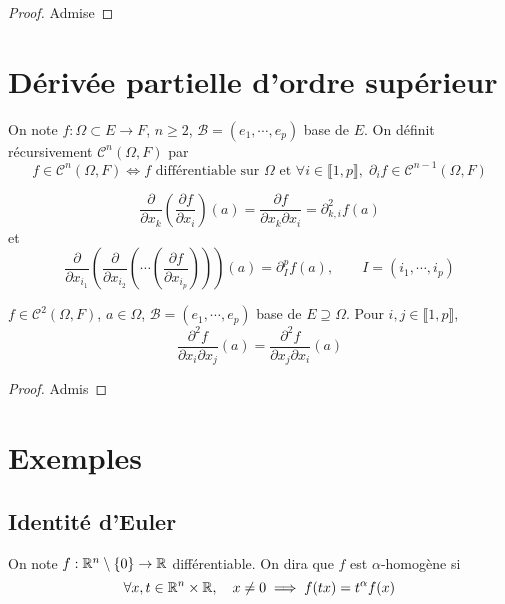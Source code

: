 \begin{proof}
    Admise
\end{proof}

\section{Dérivée partielle d'ordre supérieur}

\begin{dfn}
    On note $f:\Omega\subset E\to F$, $n\geq 2$, $\mathcal B=(e_1, \cdots, e_p)$ base de $E$. On définit récursivement $\mathcal C^n(\Omega, F)$ par \[
        f\in\mathcal C^n(\Omega, F)\iff f \text{ différentiable sur }\Omega\text{ et }\forall i\in\llbracket 1, p\rrbracket, \; \partial_i f\in\mathcal C^{n-1}(\Omega, F)
    \]
\end{dfn}

\begin{notation}
    \[
        \frac{\partial}{\partial x_k} \left( \frac{\partial f}{\partial x_i}  \right) (a)= \frac{\partial f}{\partial x_k\partial x_i}=\partial^2_{k,i}f(a) 
    \]
    et \[
        \frac{\partial}{\partial x_{i_1}} \left( \frac{\partial }{\partial x_{i_2}} \left( \cdots \left( \frac{\partial f}{\partial x_{i_p}}  \right)\right)  \right)(a)=\partial^p_I f(a), \qquad I=(i_1, \cdots, i_p)
    \]
\end{notation}

\begin{thm}[Schwarz]
    \Hyp $f\in \mathcal C^2(\Omega, F)$, $a\in \Omega$, $\mathcal B=(e_1, \cdots, e_p)$ base de $E\supseteq \Omega$.
    \Conc Pour $i, j\in\llbracket 1, p\rrbracket$,  \[
        \frac{\partial^2f}{\partial x_i\partial x_j} (a)= \frac{\partial^2f}{\partial x_j\partial x_i} (a)
    \]
\end{thm}

\begin{proof}
    Admis
\end{proof}

\section{Exemples}

\subsection{Identité d'Euler}

On note $f:\mathbb R^n\setminus \{0\}\to \mathbb R$ différentiable. On dira que $f$ est $\alpha$-homogène si \[\forall x, t\in\mathbb R^n\times \mathbb R, \quad x\neq 0 \implies f(tx)=t^\alpha f(x)\]

